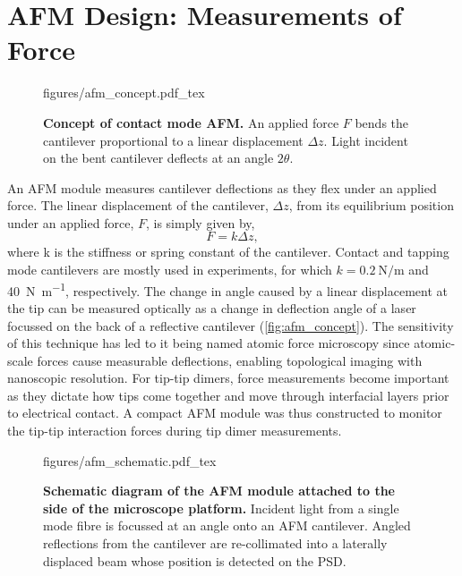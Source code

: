 \documentclass{article}
\begin{document}
\section{AFM Design: Measurements of Force}

\begin{wrapfigure}{O}{0.38\textwidth}
\centering
\vspace{-10pt}
\fontsize{10pt}{1em}\selectfont
\def\svgwidth{\textwidth}
{figures/afm_concept.pdf_tex}
\caption[Concept of contact mode AFM]{\textbf{Concept of contact mode AFM.} An applied force $F$ bends the cantilever proportional to a linear displacement $\Delta z$. Light incident on the bent cantilever deflects at an angle $2\theta$.}
\label{fig:afm_concept}
\vspace{-5pt}
\end{wrapfigure}

An AFM module measures cantilever deflections as they flex under an applied force. The linear displacement of the cantilever, $\Delta z$, from its equilibrium position under an applied force, $F$, is simply given by,
\begin{equation}
	F=k\Delta z, \label{eq:hookes_law}
\end{equation}
where \gls{k} is the stiffness or spring constant of the cantilever. Contact and tapping mode cantilevers are mostly used in experiments, for which $k=\SI{0.2}{\newton\per\metre}$ and \SI{40}{\newton\per\metre}, respectively. The change in angle caused by a linear displacement at the tip can be measured optically as a change in deflection angle of a laser focussed on the back of a reflective cantilever (\autoref{fig:afm_concept}). The sensitivity of this technique has led to it being named atomic force microscopy since atomic-scale forces cause measurable deflections, enabling topological imaging with nanoscopic resolution. For tip-tip dimers, force measurements become important as they dictate how tips come together and move through interfacial layers prior to electrical contact. A compact AFM module was thus constructed to monitor the tip-tip interaction forces during tip dimer measurements.

\begin{figure}[bt]
\centering
{\fontsize{9.5pt}{1em}\selectfont \def\svgwidth{0.8\textwidth} {figures/afm_schematic.pdf_tex}}
\caption[Schematic diagram of the AFM module.]{\textbf{Schematic diagram of the AFM module attached to the side of the microscope platform.} Incident light from a single mode fibre is focussed at an angle onto an AFM cantilever. Angled reflections from the cantilever are re-collimated into a laterally displaced beam whose position is detected on the PSD.}
\label{fig:afm_design}
\end{figure}
\end{document}
